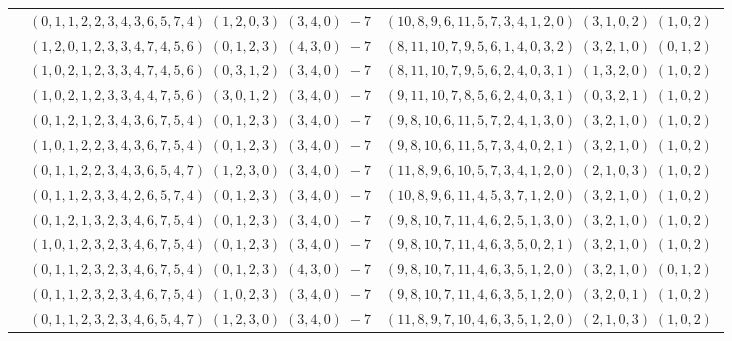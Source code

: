 \documentclass[11pt]{article}
\begin{document}
\begin{longtable}[l]{|c|c|c|}
 \cline{2-3} 
 & $(0 ,1 ,1 ,2 ,2 ,3 ,4 ,3 ,6 ,5 ,7 ,4) \;(1 ,2 ,0 ,3) \;(3 ,4 ,0) \;-7$ & $(10 ,8 ,9 ,6 ,11 ,5 ,7 ,3 ,4 ,1 ,2 ,0) \;(3 ,1 ,0 ,2) \;(1 ,0 ,2) \;$\\ 
 \cline{2-3} 
 & $(1 ,2 ,0 ,1 ,2 ,3 ,3 ,4 ,7 ,4 ,5 ,6) \;(0 ,1 ,2 ,3) \;(4 ,3 ,0) \;-7$ & $(8 ,11 ,10 ,7 ,9 ,5 ,6 ,1 ,4 ,0 ,3 ,2) \;(3 ,2 ,1 ,0) \;(0 ,1 ,2) \;$\\ 
 \cline{2-3} 
 & $(1 ,0 ,2 ,1 ,2 ,3 ,3 ,4 ,7 ,4 ,5 ,6) \;(0 ,3 ,1 ,2) \;(3 ,4 ,0) \;-7$ & $(8 ,11 ,10 ,7 ,9 ,5 ,6 ,2 ,4 ,0 ,3 ,1) \;(1 ,3 ,2 ,0) \;(1 ,0 ,2) \;$\\ 
 \cline{2-3} 
 & $(1 ,0 ,2 ,1 ,2 ,3 ,3 ,4 ,4 ,7 ,5 ,6) \;(3 ,0 ,1 ,2) \;(3 ,4 ,0) \;-7$ & $(9 ,11 ,10 ,7 ,8 ,5 ,6 ,2 ,4 ,0 ,3 ,1) \;(0 ,3 ,2 ,1) \;(1 ,0 ,2) \;$\\ 
 \cline{2-3} 
 & $(0 ,1 ,2 ,1 ,2 ,3 ,4 ,3 ,6 ,7 ,5 ,4) \;(0 ,1 ,2 ,3) \;(3 ,4 ,0) \;-7$ & $(9 ,8 ,10 ,6 ,11 ,5 ,7 ,2 ,4 ,1 ,3 ,0) \;(3 ,2 ,1 ,0) \;(1 ,0 ,2) \;$\\ 
 \cline{2-3} 
 & $(1 ,0 ,1 ,2 ,2 ,3 ,4 ,3 ,6 ,7 ,5 ,4) \;(0 ,1 ,2 ,3) \;(3 ,4 ,0) \;-7$ & $(9 ,8 ,10 ,6 ,11 ,5 ,7 ,3 ,4 ,0 ,2 ,1) \;(3 ,2 ,1 ,0) \;(1 ,0 ,2) \;$\\ 
 \cline{2-3} 
 & $(0 ,1 ,1 ,2 ,2 ,3 ,4 ,3 ,6 ,5 ,4 ,7) \;(1 ,2 ,3 ,0) \;(3 ,4 ,0) \;-7$ & $(11 ,8 ,9 ,6 ,10 ,5 ,7 ,3 ,4 ,1 ,2 ,0) \;(2 ,1 ,0 ,3) \;(1 ,0 ,2) \;$\\ 
 \cline{2-3} 
 & $(0 ,1 ,1 ,2 ,3 ,3 ,4 ,2 ,6 ,5 ,7 ,4) \;(0 ,1 ,2 ,3) \;(3 ,4 ,0) \;-7$ & $(10 ,8 ,9 ,6 ,11 ,4 ,5 ,3 ,7 ,1 ,2 ,0) \;(3 ,2 ,1 ,0) \;(1 ,0 ,2) \;$\\ 
 \cline{2-3} 
 & $(0 ,1 ,2 ,1 ,3 ,2 ,3 ,4 ,6 ,7 ,5 ,4) \;(0 ,1 ,2 ,3) \;(3 ,4 ,0) \;-7$ & $(9 ,8 ,10 ,7 ,11 ,4 ,6 ,2 ,5 ,1 ,3 ,0) \;(3 ,2 ,1 ,0) \;(1 ,0 ,2) \;$\\ 
 \cline{2-3} 
 & $(1 ,0 ,1 ,2 ,3 ,2 ,3 ,4 ,6 ,7 ,5 ,4) \;(0 ,1 ,2 ,3) \;(3 ,4 ,0) \;-7$ & $(9 ,8 ,10 ,7 ,11 ,4 ,6 ,3 ,5 ,0 ,2 ,1) \;(3 ,2 ,1 ,0) \;(1 ,0 ,2) \;$\\ 
 \cline{2-3} 
 & $(0 ,1 ,1 ,2 ,3 ,2 ,3 ,4 ,6 ,7 ,5 ,4) \;(0 ,1 ,2 ,3) \;(4 ,3 ,0) \;-7$ & $(9 ,8 ,10 ,7 ,11 ,4 ,6 ,3 ,5 ,1 ,2 ,0) \;(3 ,2 ,1 ,0) \;(0 ,1 ,2) \;$\\ 
 \cline{2-3} 
 & $(0 ,1 ,1 ,2 ,3 ,2 ,3 ,4 ,6 ,7 ,5 ,4) \;(1 ,0 ,2 ,3) \;(3 ,4 ,0) \;-7$ & $(9 ,8 ,10 ,7 ,11 ,4 ,6 ,3 ,5 ,1 ,2 ,0) \;(3 ,2 ,0 ,1) \;(1 ,0 ,2) \;$\\ 
 \cline{2-3} 
 & $(0 ,1 ,1 ,2 ,3 ,2 ,3 ,4 ,6 ,5 ,4 ,7) \;(1 ,2 ,3 ,0) \;(3 ,4 ,0) \;-7$ & $(11 ,8 ,9 ,7 ,10 ,4 ,6 ,3 ,5 ,1 ,2 ,0) \;(2 ,1 ,0 ,3) \;(1 ,0 ,2) \;$\\ 

\end{longtable}
\end{document}
